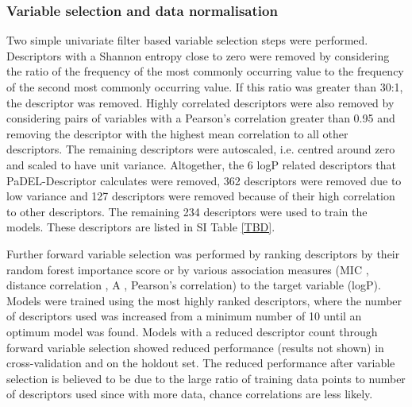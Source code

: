 \documentclass[10pt]{bmc_article}
\newenvironment{bmcformat}{\begin{raggedright}\baselineskip20pt\sloppy\setboolean{publ}{false}}{\end{raggedright}\baselineskip20pt\sloppy}
\begin{document}
\begin{bmcformat}
\subsubsection*{Variable selection and data normalisation}
Two simple univariate filter based variable selection steps were performed. Descriptors with a Shannon entropy close to zero were removed by considering the ratio of the frequency of the most commonly occurring value to the frequency of the second most commonly occurring value. If this ratio was greater than 30:1, the descriptor was removed. Highly correlated descriptors were also removed by considering pairs of variables with a Pearson's correlation greater than 0.95 and removing the descriptor with the highest mean correlation to all other descriptors. The remaining descriptors were autoscaled, i.e. centred around zero and scaled to have unit variance. Altogether, the 6 logP related descriptors that PaDEL-Descriptor calculates were removed, 362 descriptors were removed due to low variance and 127 descriptors were removed because of their high correlation to other descriptors. The remaining 234 descriptors were used to train the models. These descriptors are listed in SI Table \ref{TBD}.

Further forward variable selection was performed by ranking descriptors by their random forest importance score or by various association measures (MIC \cite{reshef_detecting_2011}, distance correlation \cite{szekely_measuring_2007}, A \cite{murrell_discovering_2013}, Pearson's correlation) to the target variable (logP). Models were trained using the most highly ranked descriptors, where the number of descriptors used was increased from a minimum number of 10 until an optimum model was found. Models with a reduced descriptor count through forward variable selection showed reduced performance (results not shown) in cross-validation and on the holdout set. The reduced performance after variable selection is believed to be due to the large ratio of training data points to number of descriptors used since with more data, chance correlations are less likely.


\end{bmcformat}
\end{document}
